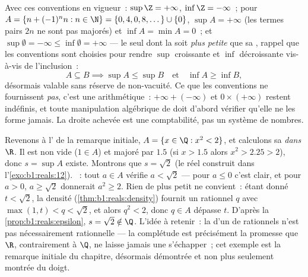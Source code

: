 \begin{example}\label{ex:b1:reals:extendedcompute}
Avec ces conventions en vigueur~: $\sup \Z = +\infty$, $\inf \Z =
-\infty$~; pour $A = \{n + (-1)^n n : n \in \N\} = \{0, 4, 0, 8,
\dots\} \cup \{0\}$, $\sup A = +\infty$ (les termes pairs $2n$ ne
sont pas majorés) et $\inf A = \min A = 0$~; et $\sup\emptyset =
-\infty \leq \inf\emptyset = +\infty$ --- le seul  dont la
 soit \emph{plus petite} que sa ,
rappel que les conventions sont choisies pour rendre $\sup$
croissante et $\inf$ décroissante vis-à-vis de l'inclusion~:
\[
A \subseteq B \implies \sup A \leq \sup B
\quad\text{et}\quad \inf A \geq \inf B ,
\]
désormais valable sans réserve de non-vacuité. Ce que les
conventions ne fournissent \emph{pas}, c'est une arithmétique~:
$+\infty + (-\infty)$ et $0 \times (+\infty)$ restent indéfinis, et
toute manipulation algébrique de  doit d'abord
vérifier qu'elle ne les forme jamais. La droite achevée est une
comptabilité, pas un système de nombres.
\end{example}

\begin{example}\label{ex:b1:reals:supescape}
Revenons à l' de la remarque initiale, $A = \{x \in \Q :
x^2 < 2\}$, et calculons sa  \emph{dans $\R$}. Il
est non vide ($1 \in A$) et majoré par $1.5$ (si $x > 1.5$ alors
$x^2 > 2.25 > 2$), donc $s = \sup A$ existe. Montrons que $s =
\sqrt 2$ (le réel construit dans l'\cref{exo:b1:reals:12}).
~: tout $a \in A$ vérifie $a < \sqrt2$ --- pour $a \leq 0$
c'est clair, et pour $a > 0$, $a \geq \sqrt2$ donnerait $a^2 \geq
2$. Rien de plus petit ne convient~: étant donné $t < \sqrt2$, la
densité (\cref{thm:b1:reals:density}) fournit un rationnel $q$ avec
$\max(1, t) < q < \sqrt 2$, et alors $q^2 < 2$, donc $q \in A$
dépasse $t$. D'après la \cref{prop:b1:reals:epsilon}, $s = \sqrt2
\notin \Q$. L'idée à retenir~: la  d'un  de
rationnels n'est pas nécessairement rationnelle --- la complétude
est précisément la promesse que $\R$, contrairement à $\Q$, ne
laisse jamais une  s'échapper~; cet exemple est la
remarque initiale du chapitre, désormais démontrée et non plus
seulement montrée du doigt.
\end{example}

